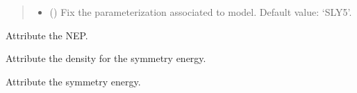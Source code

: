 \documentclass[letterpaper,10pt,english]{sphinxmanual}
\begin{document}
\begin{fulllineitems}
\begin{quote}
\begin{description}
\begin{itemize}
\item {} 
\sphinxAtStartPar
{} (\sphinxstyleliteralemphasis{\sphinxupquote{, }}) \textendash{} Fix the parameterization associated to model.     Default value: ‘SLY5’.

\end{itemize}

\end{description}\end{quote}

\sphinxAtStartPar
{}

\begin{fulllineitems}
\label{\detokenize{source/api/setup_eos_pheno:nucleardatapy.setup_eos_pheno.SetupEOSPheno.Esat}}
\pysigstartsignatures
\pysigline
{}
\pysigstopsignatures
\sphinxAtStartPar
Attribute the NEP.

\end{fulllineitems}


\begin{fulllineitems}
\label{\detokenize{source/api/setup_eos_pheno:nucleardatapy.setup_eos_pheno.SetupEOSPheno.esym_den}}
\pysigstartsignatures
\pysigline
{}
\pysigstopsignatures
\sphinxAtStartPar
Attribute the density for the symmetry energy.

\end{fulllineitems}


\begin{fulllineitems}
\label{\detokenize{source/api/setup_eos_pheno:nucleardatapy.setup_eos_pheno.SetupEOSPheno.esym_e2a}}
\pysigstartsignatures
\pysigline
{}
\pysigstopsignatures
\sphinxAtStartPar
Attribute the symmetry energy.

\end{fulllineitems}


\end{fulllineitems}
\end{document}
